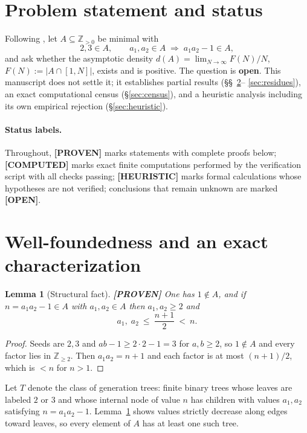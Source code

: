 \documentclass[11pt]{article}
\newtheorem{lemma}[theorem]{Lemma}
\theoremstyle{definition}
\newcommand{\A}{A}
\newcommand{\Z}{\mathbb{Z}}
\newcommand{\F}{F}
\begin{document}
\section{Problem statement and status}\label{sec:problem}

Following \cite{green100}, let $\A\subseteq\Z_{>0}$ be minimal with
\[
2,3\in\A,\qquad a_1,a_2\in\A \;\Longrightarrow\; a_1a_2-1\in\A,
\]
and ask whether the asymptotic density
$d(\A)=\lim_{N\to\infty}\F(N)/N$, $\F(N):=|\A\cap[1,N]|$,
exists and is positive. The question is \textbf{open}. This manuscript does
not settle it; it establishes partial results (\S\S~\ref{sec:structure}--%
\ref{sec:residues}), an exact computational census (\S\ref{sec:census}), and a
heuristic analysis including its own empirical rejection (\S\ref{sec:heuristic}).

\paragraph{Status labels.} Throughout, \textbf{[PROVEN]} marks statements with
complete proofs below; \textbf{[COMPUTED]} marks exact finite computations
performed by the verification script with all checks passing;
\textbf{[HEURISTIC]} marks formal calculations whose hypotheses are not
verified; conclusions that remain unknown are marked \textbf{[OPEN]}.

\section{Well-foundedness and an exact characterization}\label{sec:structure}

\begin{lemma}[Structural fact]\label{lem:struct}\textbf{[PROVEN]}
One has $1\notin\A$, and if $n=a_1a_2-1\in\A$ with $a_1,a_2\in\A$ then
$a_1,a_2\ge 2$ and
\[
a_1,\;a_2\ \le\ \frac{n+1}{2}\ <\ n .
\]
\end{lemma}

\begin{proof}
Seeds are $2,3$ and $ab-1\ge 2\cdot2-1=3$ for $a,b\ge2$, so $1\notin\A$ and
every factor lies in $\Z_{\ge2}$. Then $a_1a_2=n+1$ and each factor is at most
$(n+1)/2$, which is $<n$ for $n>1$.
\end{proof}

Let $T$ denote the class of generation trees: finite binary trees whose leaves
are labeled $2$ or $3$ and whose internal node of value $n$ has children with
values $a_1,a_2$ satisfying $n=a_1a_2-1$. Lemma~\ref{lem:struct} shows values
strictly decrease along edges toward leaves, so every element of $\A$ has at
least one such tree.
\end{document}
